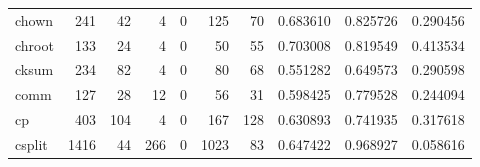 \begin{tabular}{lrrrrrrrrr}
chown     &                                                241 &                                                 42 &                                                  4 &                                                  0 &                                                125 &                                                 70 &                                           0.683610 &                               0.825726 &                             0.290456 \\
chroot    &                                                133 &                                                 24 &                                                  4 &                                                  0 &                                                 50 &                                                 55 &                                           0.703008 &                               0.819549 &                             0.413534 \\
cksum     &                                                234 &                                                 82 &                                                  4 &                                                  0 &                                                 80 &                                                 68 &                                           0.551282 &                               0.649573 &                             0.290598 \\
comm      &                                                127 &                                                 28 &                                                 12 &                                                  0 &                                                 56 &                                                 31 &                                           0.598425 &                               0.779528 &                             0.244094 \\
cp        &                                                403 &                                                104 &                                                  4 &                                                  0 &                                                167 &                                                128 &                                           0.630893 &                               0.741935 &                             0.317618 \\
csplit    &                                               1416 &                                                 44 &                                                266 &                                                  0 &                                               1023 &                                                 83 &                                           0.647422 &                               0.968927 &                             0.058616 \\

\end{tabular}
